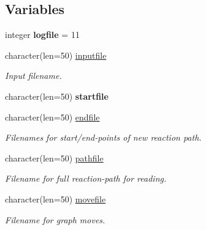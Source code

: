 \subsection*{Variables}
\begin{DoxyCompactItemize}
\item 
\mbox{\label{namespaceglobaldata_a5909f8c2ded8072344ec33fca3a9a28b}} 
integer {\bfseries logfile} = 11
\item 
\mbox{\label{namespaceglobaldata_a160e8950255a4222d251e6600b9e7e15}} 
character(len=50) \mbox{\hyperlink{namespaceglobaldata_a160e8950255a4222d251e6600b9e7e15}{inputfile}}
\begin{DoxyCompactList}\small\item\em Input filename. \end{DoxyCompactList}\item 
\mbox{\label{namespaceglobaldata_a704033d9b79e75b8fd0012544f5895e7}} 
character(len=50) {\bfseries startfile}
\item 
\mbox{\label{namespaceglobaldata_a2fa6dae46516821918eb11db7c5a8ed1}} 
character(len=50) \mbox{\hyperlink{namespaceglobaldata_a2fa6dae46516821918eb11db7c5a8ed1}{endfile}}
\begin{DoxyCompactList}\small\item\em Filenames for start/end-\/points of new reaction path. \end{DoxyCompactList}\item 
\mbox{\label{namespaceglobaldata_aba164f7220bc200c4e7bb107530a8203}} 
character(len=50) \mbox{\hyperlink{namespaceglobaldata_aba164f7220bc200c4e7bb107530a8203}{pathfile}}
\begin{DoxyCompactList}\small\item\em Filename for full reaction-\/path for reading. \end{DoxyCompactList}\item 
\mbox{\label{namespaceglobaldata_ad276e505a83055c5b175ea8de226ebcb}} 
character(len=50) \mbox{\hyperlink{namespaceglobaldata_ad276e505a83055c5b175ea8de226ebcb}{movefile}}
\begin{DoxyCompactList}\small\item\em Filename for graph moves. \end{DoxyCompactList}\item 

\end{DoxyCompactItemize}
